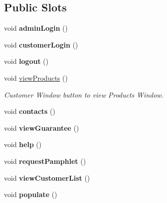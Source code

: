 \subsection*{Public Slots}
\begin{DoxyCompactItemize}
\item 
\mbox{\label{class_main_window_a91d73d4813d9994c8959a85997861960}} 
void {\bfseries admin\+Login} ()
\item 
\mbox{\label{class_main_window_a9cce5254834fcf5848fd4afb1abcc4b0}} 
void {\bfseries customer\+Login} ()
\item 
\mbox{\label{class_main_window_ab2539ea587be5e2abde872300d475df7}} 
void {\bfseries logout} ()
\item 
void \mbox{\hyperlink{class_main_window_aa76b76e15140b8d87926542b0cbee9a3}{view\+Products}} ()
\begin{DoxyCompactList}\small\item\em Customer Window button to view Products Window. \end{DoxyCompactList}\item 
\mbox{\label{class_main_window_a14784497acafa7c9b035f036466d8225}} 
void {\bfseries contacts} ()
\item 
\mbox{\label{class_main_window_ac48e37766a3bbee22cb82fd32ed6b30b}} 
void {\bfseries view\+Guarantee} ()
\item 
\mbox{\label{class_main_window_a185c3927a39f35758683d821fe16d3a7}} 
void {\bfseries help} ()
\item 
\mbox{\label{class_main_window_a660d1b4fd70db9d4fffb6621098ddcc4}} 
void {\bfseries request\+Pamphlet} ()
\item 
\mbox{\label{class_main_window_aaab61053a622840f65c394771133b28a}} 
void {\bfseries view\+Customer\+List} ()
\item 
\mbox{\label{class_main_window_a92b8246bb9207990c0cc41a2a9390bdd}} 
void {\bfseries populate} ()
\item 
\mbox{\label{class_main_window_a661e495fc5b587dce8c7b930120098aa}} 

\end{DoxyCompactItemize}
